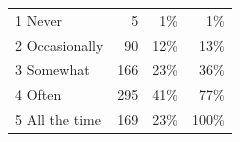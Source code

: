 \documentclass[empirical, authordate]{jote-new-article}
\begin{document}
\begin{table}
\begin{tabularx}{\linewidth}{@{} X  r  r r@{}}
    1 Never                                 & 5        & 1\%               & 1\%                          \\
    2 Occasionally                          & 90       & 12\%              & 13\%                         \\
    3 Somewhat                              & 166      & 23\%              & 36\%                         \\
    4 Often                                 & 295      & 41\%              & 77\%                         \\
    5 All the time                          & 169      & 23\%              & 100\%                        \\
  \end{tabularx}


\end{table}

\addtocounter{table}{-1}
\end{document}
